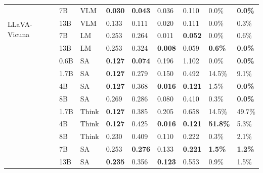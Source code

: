 \begin{table}[ht]
\begin{tabular}{lllllllll}
    \midrule
    \multirow{4}{*}{LLaVA-Vicuna} & 7B & VLM & \textbf{0.030} & \textbf{0.043} & 0.036 & 0.110 & 0.0\% & \textbf{0.0\%} \\
     & 13B & VLM & 0.133 & 0.111 & 0.020 & 0.111 & 0.0\% & 0.3\% \\
     & 7B & LM & 0.253 & 0.264 & 0.011 & \textbf{0.052} & 0.0\% & 0.6\% \\
     & 13B & LM & 0.253 & 0.324 & \textbf{0.008} & 0.059 & \textbf{0.6\%} & \textbf{0.0\%} \\
    \midrule
     & 0.6B & SA & \textbf{0.127} & \textbf{0.074} & 0.196 & 1.102 & 0.0\% & \textbf{0.0\%} \\
     & 1.7B & SA & \textbf{0.127} & 0.279 & 0.150 & 0.492 & 14.5\% & 9.1\% \\
     & 4B & SA & \textbf{0.127} & 0.368 & \textbf{0.016} & \textbf{0.121} & 1.5\% & \textbf{0.0\%} \\
     & 8B & SA & 0.269 & 0.286 & 0.080 & 0.410 & 0.3\% & \textbf{0.0\%} \\
     & 1.7B & Think & \textbf{0.127} & 0.385 & 0.205 & 0.658 & 14.5\% & 49.7\% \\
     & 4B & Think & \textbf{0.127} & 0.425 & \textbf{0.016} & \textbf{0.121} & \textbf{51.8\%} & 5.3\% \\
     & 8B & Think & 0.230 & 0.409 & 0.110 & 0.222 & 0.3\% & 2.1\% \\
    \midrule
     & 7B & SA & 0.253 & \textbf{0.276} & 0.133 & \textbf{0.221} & \textbf{1.5\%} & \textbf{1.2\%} \\
     & 13B & SA & \textbf{0.235} & 0.356 & \textbf{0.123} & 0.553 & 0.9\% & 1.5\% \\
\bottomrule
\end{tabular}
\end{table}

